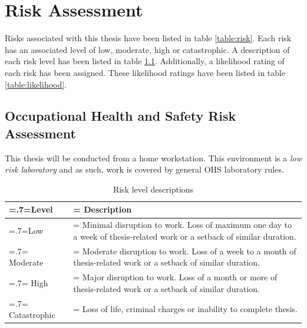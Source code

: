\documentclass[twocolumn]{article}
\begin{document}

\chapter{Risk Assessment}
Risks associated with this thesis have been listed in table \ref{table:risk}. Each risk has an associated level of low, moderate, high or catastrophic. A description of each risk level has been listed in table \ref{table:risklevel}. Additionally, a likelihood rating of each risk has been assigned. These likelihood ratings have been listed in table \ref{table:likelihood}.

\section{Occupational Health and Safety Risk Assessment}
This thesis will be conducted from a home workstation. This environment is a \textit{low risk laboratory} and as such, work is covered by general OHS laboratory rules.

\clearpage
\begin{table}
    \begin{center}
        \begin{tabularx}{\linewidth} { 
            | >{\hsize=.7\hsize\linewidth=\hsize}X 
            | >{\hsize=1.3\hsize\linewidth=\hsize}X  | }
            \hline
            \textbf{Level} & \textbf{Description} \\
            \hline
            Low & Minimal disruption to work. Loss of maximum one day to a week of thesis-related work or a setback of similar duration. \\
            \hline
            Moderate & Moderate disruption to work. Loss of a week to a month of thesis-related work or a setback of similar duration. \\
            \hline
            High & Major disruption to work. Loss of a month or more of thesis-related work or a setback of similar duration. \\
            \hline
            Catastrophic & Loss of life, criminal charges or inability to complete thesis. \\
            \hline
        \end{tabularx}
    \end{center}
    \caption{Risk level descriptions}
    \label{table:risklevel}
\end{table}
\end{document}
